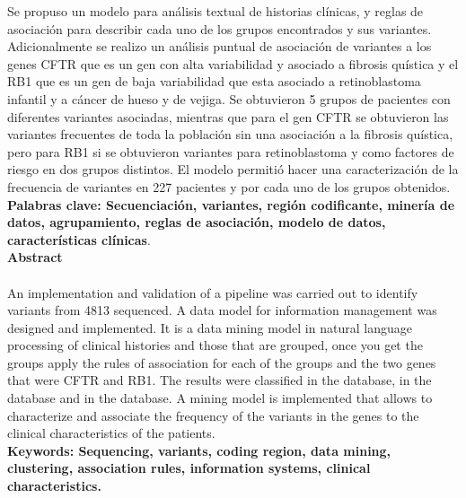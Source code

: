 Se propuso un modelo para análisis textual de historias clínicas, y reglas de asociación para describir cada uno de los grupos encontrados y sus variantes. Adicionalmente se realizo un análisis puntual de asociación de variantes a los genes CFTR que es un gen con alta variabilidad y asociado a fibrosis quística  y el RB1 que es un gen de baja variabilidad que esta asociado a retinoblastoma infantil y a cáncer de hueso y de vejiga. Se obtuvieron 5 grupos de pacientes con diferentes variantes asociadas, mientras que para el gen CFTR se obtuvieron las variantes frecuentes de toda la población sin una asociación a la fibrosis quística, pero para RB1 si se obtuvieron variantes para retinoblastoma y como factores de riesgo en dos grupos distintos. El modelo permitió hacer una caracterización de la frecuencia de variantes en 227 pacientes y por cada uno de los grupos obtenidos.  \\

\textbf{\small Palabras clave: Secuenciación, variantes, región codificante, minería de datos, agrupamiento, reglas de asociación, modelo de datos, características clínicas}.\\


\textbf{\LARGE Abstract}\\\\
An implementation and validation of a pipeline was carried out to identify variants from 4813 sequenced. A data model for information management was designed and implemented. It is a data mining model in natural language processing of clinical histories and those that are grouped, once you get the groups apply the rules of association for each of the groups and the two genes that were  CFTR and RB1. The results were classified in the database, in the database and in the database. A mining model is implemented that allows to characterize and associate the frequency of the variants in the genes to the clinical characteristics of the patients.\\[2.0cm]
\textbf{\small Keywords: Sequencing, variants, coding region, data mining, clustering, association rules, information systems, clinical characteristics.}\\